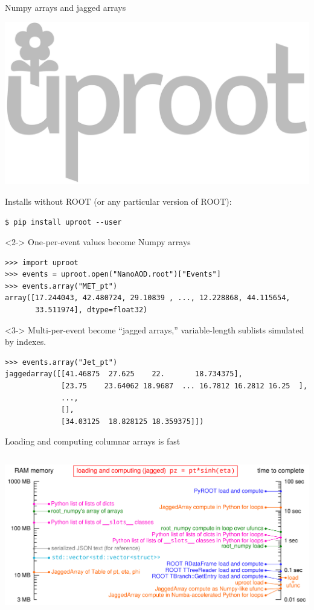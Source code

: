 \documentclass[aspectratio=169]{beamer}
\begin{document}
\begin{frame}[fragile]{Numpy arrays and jagged arrays}
\normalsize
\vspace{0.35 cm}

\hfill \includegraphics[height=1 cm]{uproot-logo.pdf}

\vspace{-1.1 cm}
Installs without ROOT (or any particular version of ROOT):

\small
\begin{verbatim}
$ pip install uproot --user
\end{verbatim}
\normalsize

\begin{uncoverenv}<2->
One-per-event values become Numpy arrays

\small
\begin{verbatim}
>>> import uproot
>>> events = uproot.open("NanoAOD.root")["Events"]
>>> events.array("MET_pt")
array([17.244043, 42.480724, 29.10839 , ..., 12.228868, 44.115654,
       33.511974], dtype=float32)
\end{verbatim}
\end{uncoverenv}
\normalsize

\begin{uncoverenv}<3->
Multi-per-event become ``jagged arrays,'' variable-length sublists simulated by indexes.

\small
\begin{verbatim}
>>> events.array("Jet_pt")
jaggedarray([[41.46875  27.625    22.       18.734375],
             [23.75    23.64062 18.9687  ... 16.7812 16.2812 16.25  ],
             ...,
             [],
             [34.03125  18.828125 18.359375]])
\end{verbatim}
\end{uncoverenv}
\end{frame}

\begin{frame}{Loading and computing columnar arrays is fast}
\vspace{0.3 cm}
\begin{columns}
\includegraphics[width=\linewidth]{logscales.pdf}
\end{columns}
\end{frame}
\end{document}
